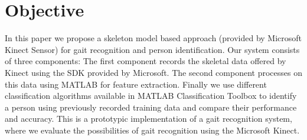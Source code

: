 \section{Objective} \label{Objective}
\noindent In this paper we propose a skeleton model based approach (provided by Microsoft Kinect Sensor) for gait recognition and person identification. Our system consists of three components: The first component records the skeletal data offered by Kinect using the SDK provided by Microsoft. The second component processes on this data using MATLAB for feature extraction. Finally we use different classification algorithms available in MATLAB Classification Toolbox to identify a person using previously recorded training data and compare their performance and accuracy. This is a prototypic implementation of a gait recognition system, where we evaluate the possibilities of gait recognition using the Microsoft Kinect.
